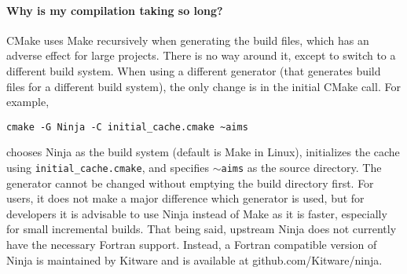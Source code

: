 \paragraph{Why is my compilation taking so long?}

CMake uses Make recursively when generating the build files, which has an adverse effect for large projects. There is no way around it, except to switch to a different build system. When using a different generator (that generates build files for a different build system), the only change is in the initial CMake call. For example,
\begin{verbatim}
cmake -G Ninja -C initial_cache.cmake ~aims
\end{verbatim}
chooses Ninja as the build system (default is Make in Linux), initializes the cache using \texttt{initial\_cache.cmake}, and specifies $\sim$\texttt{aims} as the source directory. The generator cannot be changed without emptying the build directory first. For users, it does not make a major difference which generator is used, but for developers it is advisable to use Ninja instead of Make as it is faster, especially for small incremental builds. That being said, upstream Ninja does not currently have the necessary Fortran support. Instead, a Fortran compatible version of Ninja is maintained by Kitware and is available at github.com/Kitware/ninja.

